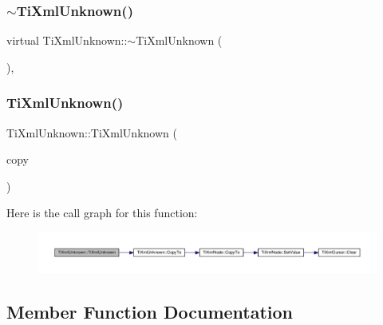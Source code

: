 \subsubsection{\texorpdfstring{$\sim$\+Ti\+Xml\+Unknown()}{~TiXmlUnknown()}}
{\footnotesize\ttfamily virtual Ti\+Xml\+Unknown\+::$\sim$\+Ti\+Xml\+Unknown (\begin{DoxyParamCaption}{ }\end{DoxyParamCaption})\hspace{0.3cm}{\ttfamily [inline]}, {\ttfamily [virtual]}}

\mbox{\label{class_ti_xml_unknown_abe798ff4feea31474850c7f0de6bdf5e}} 
\subsubsection{\texorpdfstring{Ti\+Xml\+Unknown()}{TiXmlUnknown()}\hspace{0.1cm}{\footnotesize\ttfamily [2/2]}}
{\footnotesize\ttfamily Ti\+Xml\+Unknown\+::\+Ti\+Xml\+Unknown (\begin{DoxyParamCaption}\item[{const \hyperlink{class_ti_xml_unknown}{Ti\+Xml\+Unknown} \&}]{copy }\end{DoxyParamCaption})\hspace{0.3cm}{\ttfamily [inline]}}

Here is the call graph for this function\+:\nopagebreak
\begin{figure}[H]
\begin{center}
\leavevmode
\includegraphics[width=350pt]{class_ti_xml_unknown_abe798ff4feea31474850c7f0de6bdf5e_cgraph}
\end{center}
\end{figure}


\subsection{Member Function Documentation}
\mbox{\label{class_ti_xml_unknown_aafdf1b2d4f561979c7907bad91004999}} 
